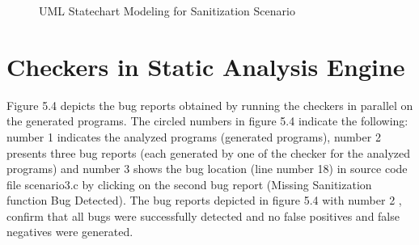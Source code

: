\begin{figure}[htbp]
	\centering
	\label{sanitization_scenario}
	\caption{UML Statechart Modeling for Sanitization Scenario}
\end{figure}

\section{Checkers in Static Analysis Engine}
Figure 5.4 depicts the bug reports obtained by running the
checkers in parallel on the generated programs. The circled numbers in figure 5.4 indicate the following: number 1 indicates the analyzed programs (generated programs), number
2 presents three bug reports (each generated by one of the checker for the analyzed programs) and number 3 shows the
bug location (line number 18) in source code file scenario3.c by
clicking on the second bug report (Missing Sanitization function Bug
Detected). The bug reports depicted in figure 5.4 with number
2 , confirm that all bugs were successfully detected and no
false positives and false negatives were generated.
